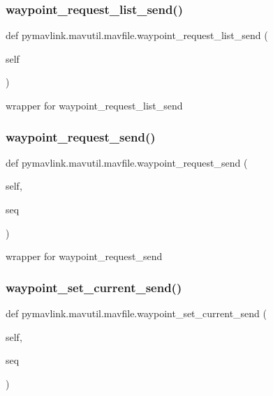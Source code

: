 \subsubsection{\texorpdfstring{waypoint\+\_\+request\+\_\+list\+\_\+send()}{waypoint\_request\_list\_send()}}
{\footnotesize\ttfamily def pymavlink.\+mavutil.\+mavfile.\+waypoint\+\_\+request\+\_\+list\+\_\+send (\begin{DoxyParamCaption}\item[{}]{self }\end{DoxyParamCaption})}

\begin{DoxyVerb}wrapper for waypoint_request_list_send\end{DoxyVerb}
 \mbox{\label{classpymavlink_1_1mavutil_1_1mavfile_af14da05495c0927374c4356a527ad406}} 
\subsubsection{\texorpdfstring{waypoint\+\_\+request\+\_\+send()}{waypoint\_request\_send()}}
{\footnotesize\ttfamily def pymavlink.\+mavutil.\+mavfile.\+waypoint\+\_\+request\+\_\+send (\begin{DoxyParamCaption}\item[{}]{self,  }\item[{}]{seq }\end{DoxyParamCaption})}

\begin{DoxyVerb}wrapper for waypoint_request_send\end{DoxyVerb}
 \mbox{\label{classpymavlink_1_1mavutil_1_1mavfile_a5ada29335e23c51ef5902135668d07db}} 
\subsubsection{\texorpdfstring{waypoint\+\_\+set\+\_\+current\+\_\+send()}{waypoint\_set\_current\_send()}}
{\footnotesize\ttfamily def pymavlink.\+mavutil.\+mavfile.\+waypoint\+\_\+set\+\_\+current\+\_\+send (\begin{DoxyParamCaption}\item[{}]{self,  }\item[{}]{seq }\end{DoxyParamCaption})}

